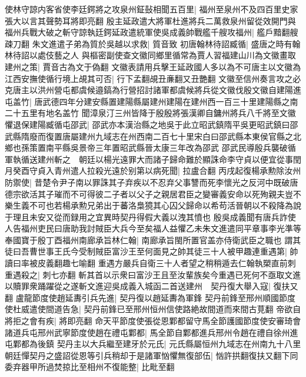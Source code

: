 使林守諒内客省使李廷鍔將之攻泉州鉦鼔相聞五百里|{
	福州至泉州不及四百里史家張大以言其聲勢耳將即亮翻}
殷主延政遣大將軍杜進將兵二萬救泉州留從效開門與福州兵戰大破之斬守諒執廷鍔延政遣統軍使吳成義帥戰艦千艘攻福州|{
	艦戶黯翻艘疎刀翻}
朱文進遣子弟為質於吳越以求救|{
	質音致}
初唐翰林待詔臧循|{
	盛唐之時有翰林待詔以處伎藝之人}
與樞密副使查文徽同鄉里循常為賈人習福建山川為文徽畫取建州之策|{
	賈音古為文于偽翻}
文徽表請用兵擊王延政國人多以為不可唐主以文徽為江西安撫使循行境上覘其可否|{
	行下孟翻覘丑亷翻又丑艷翻}
文徽至信州奏言攻之必克唐主以洪州營屯都虞候邉鎬為行營招討諸軍都虞候將兵從文徽伐殷文徽自建陽進屯盖竹|{
	唐武德四年分建安縣置建陽縣屬建州建陽在建州西一百三十里建陽縣之南二十五里有地名盖竹}
聞漳泉汀三州皆降于殷殷將張漢卿自鏞州將兵八千將至文徽懼退保建陽臧循屯邵武|{
	邵武亦本漢治縣之地吳于此立昭武鎮隋平吳更昭武鎮曰邵武縣隋廢而復置唐屬建州九域志在州西南二百七十里宋白曰邵武縣本東侯官縣之北鄉也孫策置南平縣吳景帝三年置昭武縣晉太康三年改為邵武}
邵武民導殷兵襲破循軍執循送建州斬之　朝廷以楊光遠罪大而諸子歸命難於顯誅命李守貞以便宜從事閏月癸酉守貞入青州遣人拉殺光遠於别第以病死聞|{
	拉盧合翻}
丙戌起復楊承勲除汝州防禦使|{
	昔楚令尹子南以罪誅其子弃疾以不忍弃父事讐而死李懷光之反河中既破唐德宗欲活其子璀而不可得彼二子者以父子之親居君臣之變審義安命以死殉親夫豈不樂生義不可也若楊承勲兄弟出于蕃洛梟獍其心囚父歸命以希苟活晉朝以不殺降為說于理且未安又從而録用之宜異時契丹得假大義以洩其憤也}
殷吳成義聞有唐兵詐使人告福州吏民曰唐助我討賊臣大兵今至矣福人益懼乙未朱文進遣同平章事李光準等奉國寶于殷丁酉福州南廊承旨林仁翰|{
	南廊承旨閩所置官盖亦侍衛武臣之職也}
謂其徒曰吾曹世事王氏今受制賊臣富沙王至何面見之帥其徒三十人被甲趣連重遇第|{
	帥讀曰率被皮義翻趣七喻翻}
重遇方嚴兵自衛三十人者望之稍稍遁去仁翰執槊直前刺重遇殺之|{
	刺七亦翻}
斬其首以示衆曰富沙王且至汝輩族矣今重遇已死何不亟取文進以贖罪衆踊躍從之遂斬文進迎吳成義入城函二首送建州　契丹復大舉入寇|{
	復扶又翻}
盧龍節度使趙延夀引兵先進|{
	契丹復以趙延夀為軍鋒}
契丹前鋒至邢州順國節度使杜威遣使間道告急|{
	契丹前鋒已至邢州恒州信使路絶故間道而來間古莧翻}
帝欲自將拒之會有疾|{
	將即亮翻}
命天平節度使張從恩鄴都留守馬全節護國節度使安審琦會諸道兵屯邢州武寧節度使趙在禮屯鄴都|{
	馬全節自鄴都進兵邢州令趙在禮自徐州進屯鄴都為後鎮}
契丹主以大兵繼至建牙於元氏|{
	元氏縣屬恒州九域志在州南九十八里}
朝廷憚契丹之盛詔從恩等引兵稍却于是諸軍忷懼無復部伍|{
	忷許拱翻復扶又翻下同}
委弃器甲所過焚掠比至相州不復能整|{
	比毗至翻}


